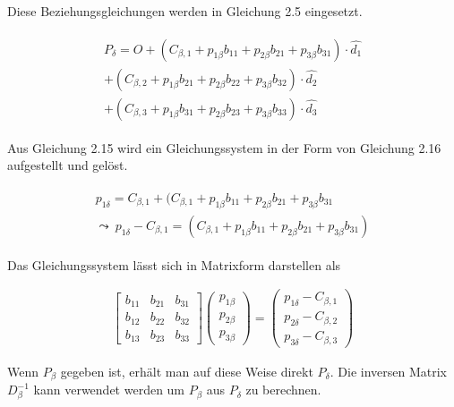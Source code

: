 Diese Beziehungsgleichungen werden in Gleichung 2.5 eingesetzt.

\begin{gather}
	\begin{split}
		P_\delta = O + (C_{\beta,1} + p_{1\beta}b_{11} +  p_{2\beta}b_{21} + p_{3\beta}b_{31}) \cdot \hat{d_1}\\
		+(C_{\beta,2} + p_{1\beta}b_{21} +  p_{2\beta}b_{22} + p_{3\beta}b_{32} )\cdot \hat{d_2}\\
		+ (C_{\beta,3} + p_{1\beta}b_{31} +  p_{2\beta}b_{23} + p_{3\beta}b_{33} )\cdot \hat{d_3}
	\end{split}
\end{gather}

Aus Gleichung 2.15 wird ein Gleichungssystem in der Form von Gleichung 2.16 aufgestellt und gelöst.

\begin{gather}
	\begin{split}
		p_{1\delta} = C_{\beta,1} + (C_{\beta,1} + p_{1\beta}b_{11} +  p_{2\beta}b_{21} + p_{3\beta}b_{31} \\
		\leadsto \: p_{1\delta} - C_{\beta,1} =  (C_{\beta,1} + p_{1\beta}b_{11} +  p_{2\beta}b_{21} + p_{3\beta}b_{31})
	\end{split}
\end{gather}

Das Gleichungssystem lässt sich in Matrixform darstellen als 

\begin{gather}
	\begin{bmatrix}b_{11} & b_{21} & b_{31}\\
		b_{12} & b_{22} & b_{32}\\
		b_{13} & b_{23} & b_{33}
	\end{bmatrix} 
	\begin{pmatrix}
		p_{1\beta}\\p_{2\beta}\\ p_{3\beta}
	\end{pmatrix} = 
	\begin{pmatrix}
		p_{1\delta} - C_{\beta,1}\\
		p_{2\delta} - C_{\beta,2}\\
		p_{3\delta} - C_{\beta,3}
	\end{pmatrix}
\end{gather}

Wenn $P_\beta$ gegeben ist, erhält man auf diese Weise direkt $P_\delta$. Die inversen Matrix $\ensuremath{D_\beta^{-1}}$ kann verwendet werden um  $P_\beta$ aus $P_\delta$ zu berechnen. 

